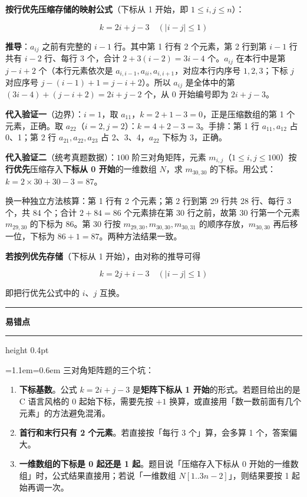 \documentclass[11pt,openany,UTF8]{ctexbook}
\newcommand{\callouthead}[2]{%
  \par\addvspace{7pt}\noindent
  {\color{#1}\rule[-0.15em]{3pt}{1.05em}}\hspace{0.5em}%
  {\bfseries\color{#1}#2}\par\nobreak\vspace{-0.35em}%
  {\color{rulesep}\hrule height 0.4pt}\nobreak\vspace{0.45em}%
  \begingroup\small\setlength{\parindent}{0pt}%
  \leftskip=1.1em\rightskip=0.6em\noindent\ignorespaces}
\newcommand{\calloutend}{\par\endgroup\addvspace{7pt}}
\newenvironment{callwarn}[1]{\callouthead{warnbar}{#1}}{\calloutend}
\begin{document}
\textbf{按行优先压缩存储的映射公式}（下标从 1 开始，即 $1 \le i, j \le n$）：

\[k = 2i + j - 3 \quad (|i - j| \le 1)\]

\textbf{推导}：$a_{ij}$ 之前有完整的 $i - 1$ 行。其中第 1 行有 2 个元素，第 2 行到第 $i-1$ 行共有 $i - 2$ 行、每行 3 个，合计 $2 + 3(i-2) = 3i - 4$ 个。$a_{ij}$ 在本行中是第 $j - i + 2$ 个（本行元素依次是 $a_{i,i-1}, a_{ii}, a_{i,i+1}$，对应本行内序号 $1, 2, 3$；下标 $j$ 对应序号 $j - (i-1) + 1 = j - i + 2$）。所以 $a_{ij}$ 是全体中的第 $(3i - 4) + (j - i + 2) = 2i + j - 2$ 个，从 0 开始编号即为 $2i + j - 3$。

\textbf{代入验证一}（边界）：$i = 1$，取 $a_{11}$，$k = 2 + 1 - 3 = 0$，正是压缩数组的第 1 个元素，正确。取 $a_{22}$（$i=2,j=2$）：$k = 4 + 2 - 3 = 3$。手排：第 1 行 $a_{11},a_{12}$ 占 0、1；第 2 行 $a_{21},a_{22},a_{23}$ 占 2、3、4，$a_{22}$ 下标为 3，正确。

\textbf{代入验证二}（统考真题数据）：$100$ 阶三对角矩阵，元素 $m_{i,j}$（$1 \le i, j \le 100$）按\textbf{行优先}压缩存入\textbf{下标从 0 开始}的一维数组 $N$，求 $m_{30,30}$ 的下标。用公式：$k = 2 \times 30 + 30 - 3 = 87$。

换一种独立方法核算：第 1 行有 2 个元素；第 2 行到第 29 行共 28 行、每行 3 个，共 84 个；合计 $2 + 84 = 86$ 个元素排在第 30 行之前，故第 30 行第一个元素 $m_{29,30}$ 的下标为 86。第 30 行按 $m_{29,30}, m_{30,30}, m_{30,31}$ 的顺序存放，$m_{30,30}$ 再后移一位，下标为 $86 + 1 = 87$。两种方法结果一致。

\textbf{若按列优先存储}（下标从 1 开始），由对称的推导可得

\[k = 2j + i - 3 \quad (|i - j| \le 1)\]

即把行优先公式中的 $i$、$j$ 互换。

\begin{callwarn}{易错点}
三对角矩阵题的三个坑：

\begin{enumerate}
\item \textbf{下标基数}。公式 $k = 2i + j - 3$ 是\textbf{矩阵下标从 1 开始}的形式。若题目给出的是 C 语言风格的 $0$ 起始下标，需要先按 $+1$ 换算，或直接用「数一数前面有几个元素」的方法避免混淆。
\item \textbf{首行和末行只有 2 个元素}。若直接按「每行 3 个」算，会多算 1 个，答案偏大。
\item \textbf{一维数组的下标是 0 起还是 1 起}。题目说「压缩存入下标从 0 开始的一维数组」时，公式结果直接用；若说「一维数组 $N[1..3n-2]$」，则结果要按 1 起始再调一次。
\end{enumerate}
\end{callwarn}
\end{document}
